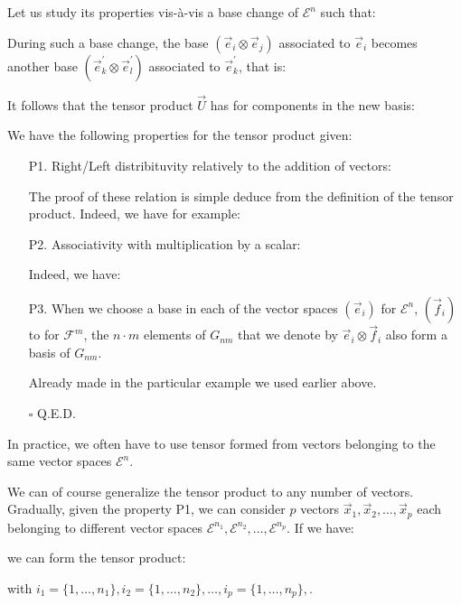 	Let us study its properties vis-à-vis a base change of $\mathcal{E}^n$ such that:
	
	During such a base change, the base $(\vec{e}_i\otimes\vec{e}_j)$ associated to $\vec{e}_i$  becomes another base $(\vec{e}_k^{'}\otimes\vec{e}_l^{'})$ associated to $\vec{e}_k^{'}$, that is:
	
	It follows that the tensor product $\vec{U}$ has for components in the new basis:
	
	We have the following properties for the tensor product given:
	
	\begin{enumerate}
		\item[P1.] Right/Left distribituvity relatively to the addition of vectors:
		
		The proof of these relation is simple deduce from the definition of the tensor product. Indeed, we have for example:
		
		
		\item[P2.] Associativity with multiplication by a scalar:
		
		Indeed, we have:
		
	
		\item[P3.] When we choose a base in each of the vector spaces $(\vec{e}_i)$ for $\mathcal{E}^n$, $(\vec{f}_i)$ to for $\mathcal{F}^m$, the $n\cdot m$ elements of $G_{nm}$ that we denote by $\vec{e}_i \otimes\vec{f}_i$ also form a basis of $G_{nm}$.
		\begin{dem}
			Already made in the particular example we used earlier above.
		\begin{flushright}
			$\square$  Q.E.D.
		\end{flushright}
		\end{dem}
	\end{enumerate}
	\begin{tcolorbox}[title=Remark,colframe=black,arc=10pt]
	In practice, we often have to use tensor formed from vectors belonging to the same vector spaces $\mathcal{E}^n$.
	\end{tcolorbox}
	We can of course generalize the tensor product to any number of vectors. Gradually, given the property P1, we can consider $p$ vectors $\vec{x}_1,\vec{x}_2,\ldots,\vec{x}_p$ each belonging to different vector spaces $\mathcal{E}^{n_1},\mathcal{E}^{n_2},\ldots,\mathcal{E}^{n_p}$. If we have:
	
	we can form the tensor product:
	
with $i_1=\{1,\ldots,n_1\},i_2=\{1,\ldots,n_2\},\ldots,i_p=\{1,\ldots,n_p\},$.

